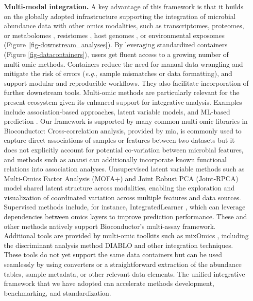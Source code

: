 \documentclass[
  sn-nature,
]{sn-jnl}
\begin{document}
\textbf{Multi-modal integration.} A key advantage of this framework is
that it builds on the globally adopted infrastructure supporting the
integration of microbial abundance data with other omics modalities,
such as transcriptomes, proteomes, or metabolomes
\citep{hintikka2021, mangnier2025}, resistomes
\citep{salehi2025, lee2023}, host genomes \citep{qin2022}, or
environmental exposomes (Figure~\ref{fig-downstream_analyses}). By
leveraging standardized containers (Figure \ref{fig-datacontainers}),
users get fluent access to a growing number of multi-omic methods.
Containers reduce the need for manual data wrangling and mitigate the
risk of errors (\emph{e.g.}, sample mismatches or data formatting), and
support modular and reproducible workflows. They also facilitate
incorporation of further downstream tools. Multi-omic methods are
particularly relevant for the present ecosystem given its enhanced
support for integrative analysis. Examples include association-based
approaches, latent variable models, and ML-based prediction
\citep{sankaran2019, sankaran2019b, sherwani2025}. Our framework is
supported by many common multi-omic libraries in Bioconductor:
Cross-correlation analysis, provided by mia, is commonly used to capture
direct associations of samples or features between two datasets but it
does not explicitly account for potential co-variation between microbial
features, and methods such as anansi \citep{bastiaanssen2023} can
additionally incorporate known functional relations into association
analyses. Unsupervised latent variable methods such as Multi-Omics
Factor Analysis (MOFA+) \citep{argelaguet2020} and Joint Robust PCA
(Joint-RPCA) \citep{vargas2026} model shared latent structure across
modalities, enabling the exploration and visualization of coordinated
variation across multiple features and data sources. Supervised methods
include, for instance, IntegratedLearner \citep{mallick2024}, which can
leverage dependencies between omics layers to improve prediction
performance. These and other methods natively support Bioconductor's
multi-assay framework. Additional tools are provided by multi-omic
toolkits such as mixOmics \citep{rohart2017}, including the discriminant
analysis method DIABLO \citep{singh2019} and other integration
techniques. These tools do not yet support the same data containers but
can be used seamlessly by using converters or a straightforward
extraction of the abundance tables, sample metadata, or other relevant
data elements. The unified integrative framework that we have adopted
can accelerate methods development, benchmarking, and standardization.
\end{document}
